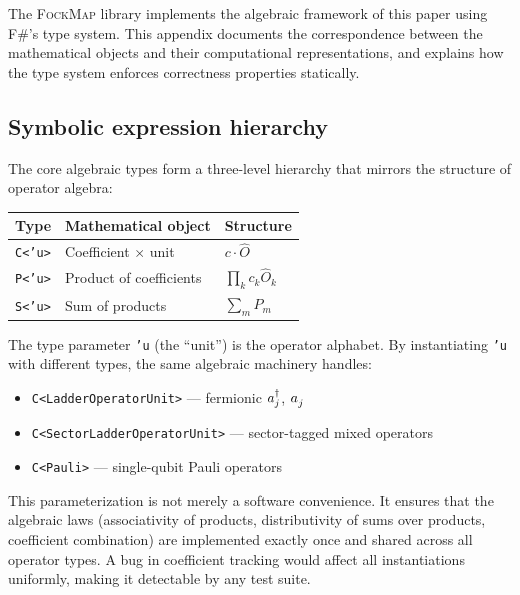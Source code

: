 %

The \textsc{FockMap} library implements the algebraic framework of this
paper using F\#'s type system.  This appendix documents the
correspondence between the mathematical objects and their
computational representations, and explains how the type system
enforces correctness properties statically.

\subsection*{Symbolic expression hierarchy}

The core algebraic types form a three-level hierarchy that mirrors the
structure of operator algebra:

\begin{center}
\begin{tabular}{@{}lll@{}}
\toprule
\textbf{Type} & \textbf{Mathematical object} & \textbf{Structure} \\
\midrule
\texttt{C<'u>} & Coefficient $\times$ unit & $c \cdot \hat{O}$ \\
\texttt{P<'u>} & Product of coefficients & $\prod_k c_k \hat{O}_k$ \\
\texttt{S<'u>} & Sum of products & $\sum_m P_m$ \\
\bottomrule
\end{tabular}
\end{center}

The type parameter \texttt{'u} (the ``unit'') is the operator alphabet.
By instantiating \texttt{'u} with different types, the same algebraic
machinery handles:

\begin{itemize}
  \item \texttt{C<LadderOperatorUnit>} --- fermionic $a_{j}^{\dagger}$, $\an{j}$
  \item \texttt{C<SectorLadderOperatorUnit>} --- sector-tagged mixed
    operators
  \item \texttt{C<Pauli>} --- single-qubit Pauli operators
\end{itemize}

This parameterization is not merely a software convenience.  It
ensures that the algebraic laws (associativity of products,
distributivity of sums over products, coefficient combination) are
implemented exactly once and shared across all operator types.
A bug in coefficient tracking would affect all instantiations
uniformly, making it detectable by any test suite.

